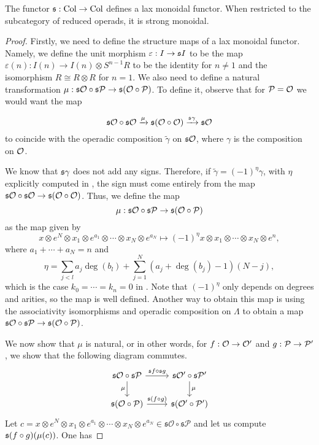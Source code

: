 \documentclass[Thesis.tex]{subfiles}
\begin{document}
\begin{propo}\label{monoidality}
The functor $\mathfrak{s}:\mathrm{Col}\to \mathrm{Col}$ defines a lax monoidal functor. When restricted to the subcategory of reduced operads, it is strong monoidal.
\end{propo}
\begin{proof}
Firstly, we need to define the structure maps of a lax monoidal functor. Namely, we define the unit morphism $\varepsilon:I\to\mathfrak{s} I$ to be the map $\varepsilon(n):I(n)\to I(n)\otimes S^{n-1}R$ to be the identity for $n\neq 1$ and the isomorphism $R\cong R\otimes R$ for $n=1$. We also need to define a natural transformation $\mu:\mathfrak{s}{\mathcal O}\circ\mathfrak{s}\mathcal{P}\to\mathfrak{s}({\mathcal O}\circ\mathcal{P})$. To define it, observe that for $\mathcal{P}={\mathcal O}$ we would want the map

\[\mathfrak{s}{\mathcal O}\circ\mathfrak{s}{\mathcal O}\xrightarrow{\mu}\mathfrak{s}({\mathcal O}\circ{\mathcal O})\xrightarrow{\mathfrak{s}\gamma}\mathfrak{s}{\mathcal O}\]
 to coincide with the operadic composition $\tilde{\gamma}$ on $\mathfrak{s}{\mathcal O}$, where $\gamma$ is the composition on ${\mathcal O}$. 
 
We know that $\mathfrak{s}\gamma$ does not add any signs. Therefore, if $\tilde{\gamma}=(-1)^\eta\gamma$, with $\eta$ explicitly computed in , the sign must come entirely from the map $\mathfrak{s}{\mathcal O}\circ\mathfrak{s}{\mathcal O}\to\mathfrak{s}({\mathcal O}\circ{\mathcal O})$. Thus, we define the map \[\mu:\mathfrak{s}{\mathcal O}\circ\mathfrak{s}\mathcal{P}\to\mathfrak{s}({\mathcal O}\circ\mathcal{P})\] as the map given by
 \[x\otimes e^N\otimes x_1\otimes e^{a_1}\otimes\cdots\otimes x_N\otimes e^{a_N}\mapsto (-1)^\eta x\otimes x_1\otimes\cdots\otimes x_N \otimes e^n,\]
 where $a_1+\cdots+a_N=n$ and 
 \[\eta=\sum_{j<l}a_j\deg(b_l)+\sum_{j=1}^N (a_j+\deg(b_j)-1)(N-j),\]
 which is the case $k_0=\cdots=k_n=0$ in . Note that $(-1)^\eta$ only depends on degrees and arities, so the map is well defined. Another way to obtain this map is using the associativity isomorphisms and operadic composition on $\Lambda$ to obtain a map $\mathfrak{s}{\mathcal O}\circ\mathfrak{s}\mathcal{P}\to\mathfrak{s}({\mathcal O}\circ\mathcal{P})$.
 
We now show that $\mu$ is natural, or in other words, for $f:{\mathcal O}\to{\mathcal O}'$ and $g:\mathcal{P}\to\mathcal{P}'$, we show that the following diagram commutes.
\[\begin{tikzcd}
\mathfrak{s}\mathcal{O}\circ\mathfrak{s}\mathcal{P} \arrow[r, "\mathfrak{s}f\circ\mathfrak{s}g"] \arrow[d, "\mu"'] & \mathfrak{s}\mathcal{O}'\circ\mathfrak{s}\mathcal{P}' \arrow[d, "\mu"] \\
\mathfrak{s}(\mathcal{O}\circ\mathcal{P}) \arrow[r, "\mathfrak{s}(f\circ g)"]                                      & \mathfrak{s}(\mathcal{O}'\circ\mathcal{P}')                           
\end{tikzcd}\]
 Let $c=x\otimes e^N\otimes x_1\otimes e^{a_1}\otimes\cdots\otimes x_N\otimes e^{a_N}\in \mathfrak{s}\mathcal{O}\circ\mathfrak{s}\mathcal{P}$ and let us compute $\mathfrak{s}(f\circ g)(\mu(c))$. One has
 

\end{proof}
\end{document}
